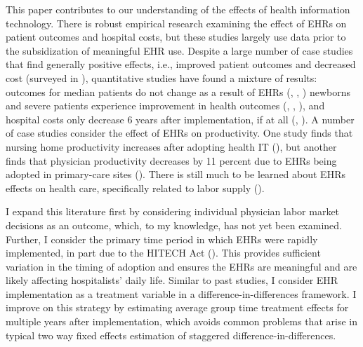 \documentclass[12pt]{article}
\begin{document}
This paper contributes to our understanding of the effects of health information technology. There is robust empirical research examining the effect of EHRs on patient outcomes and hospital costs, but these studies largely use data prior to the subsidization of meaningful EHR use. Despite a large number of case studies that find generally positive effects, i.e., improved patient outcomes and decreased cost (surveyed in \cite{Buntin2011TheResults}), quantitative studies have found a mixture of results: outcomes for median patients do not change as a result of EHRs (\cite{Agha2014TheCare}, \cite{McCullough2016HealthCoordination}, \cite{Meyerhoefer}) newborns and severe patients experience improvement in health outcomes (\cite{Miller2009}, \cite{Freedman2015}, \cite{McCullough2016HealthCoordination}), and hospital costs only decrease 6 years after implementation, if at all (\cite{Agha2014TheCare}, \cite{dranove2014trillion}). A number of case studies consider the effect of EHRs on productivity. One study finds that nursing home productivity increases after adopting health IT (\cite{Hitt2016}), but another finds that physician productivity decreases by 11 percent due to EHRs being adopted in primary-care sites (\cite{Meyerhoefer}). There is still much to be learned about EHRs effects on health care, specifically related to labor supply (\cite{NBERw29218}). 

I expand this literature first by considering individual physician labor market decisions as an outcome, which, to my knowledge, has not yet been examined. Further, I consider the primary time period in which EHRs were rapidly implemented, in part due to the HITECH Act (\cite{dranove2015investment}). This provides sufficient variation in the timing of adoption and ensures the EHRs are meaningful and are likely affecting hospitalists' daily life. Similar to past studies, I consider EHR implementation as a treatment variable in a difference-in-differences framework. I improve on this strategy by estimating average group time treatment effects for multiple years after implementation, which avoids common problems that arise in typical two way fixed effects estimation of staggered difference-in-differences.  
\end{document}
